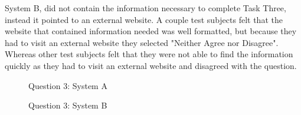 \newpage
{
System B, did not contain the information necessary to complete Task Three, instead it pointed to an external website. A couple test subjects felt that the website that contained information needed was well formatted, but because they had to visit an external website they selected "Neither Agree nor Disagree". Whereas other test subjects felt that they were not able to find the information quickly as they had to visit an external website and disagreed with the question.

\begin{figure}[!h]
  \centering
  \begin{minipage}[b]{0.44\textwidth}
    \caption{Question 3: System A}
    \label{fig:finalQ4Bioschemas}
  \end{minipage}
  \hfill
  \begin{minipage}[b]{0.44\textwidth}
    \caption{Question 3: System B}
    \label{fig:finalQ4Kaizen}
  \end{minipage}
\end{figure}

}
